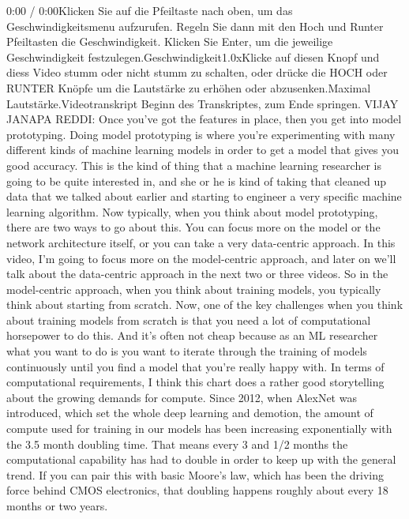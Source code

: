 {    0:00 / 0:00Klicken Sie auf die Pfeiltaste nach oben, um das Geschwindigkeitsmenu aufzurufen. Regeln Sie dann mit den Hoch und Runter Pfeiltasten die Geschwindigkeit. Klicken Sie Enter, um die jeweilige Geschwindigkeit festzulegen.Geschwindigkeit1.0xKlicke auf diesen Knopf und diess Video stumm oder nicht stumm zu schalten, oder drücke die HOCH oder RUNTER Knöpfe um die Lautstärke zu erhöhen oder abzusenken.Maximal Lautstärke.Videotranskript
    Beginn des Transkriptes, zum Ende springen.
    VIJAY JANAPA REDDI: Once you've got the features in place,
    then you get into model prototyping.
    Doing model prototyping is where you're experimenting
    with many different kinds of machine learning models
    in order to get a model that gives you good accuracy.
    This is the kind of thing that a machine learning researcher
    is going to be quite interested in, and she or he
    is kind of taking that cleaned up data that we talked about earlier
    and starting to engineer a very specific machine learning algorithm.
    Now typically, when you think about model prototyping,
    there are two ways to go about this.
    You can focus more on the model or the network architecture itself,
    or you can take a very data-centric approach.
    In this video, I'm going to focus more on the model-centric approach,
    and later on we'll talk about the data-centric approach in the next two
    or three videos.
    So in the model-centric approach, when you think about training models,
    you typically think about starting from scratch.
    Now, one of the key challenges when you think about training models
    from scratch is that you need a lot of computational horsepower to do this.
    And it's often not cheap because as an ML researcher what you want to do
    is you want to iterate through the training of models
    continuously until you find a model that you're really happy with.
    In terms of computational requirements, I
    think this chart does a rather good storytelling
    about the growing demands for compute.
    Since 2012, when AlexNet was introduced, which
    set the whole deep learning and demotion,
    the amount of compute used for training in our models
    has been increasing exponentially with the 3.5 month doubling time.
    That means every 3 and 1/2 months the computational capability
    has had to double in order to keep up with the general trend.
    If you can pair this with basic Moore's law, which
    has been the driving force behind CMOS electronics,
    that doubling happens roughly about every 18 months or two years.
}
